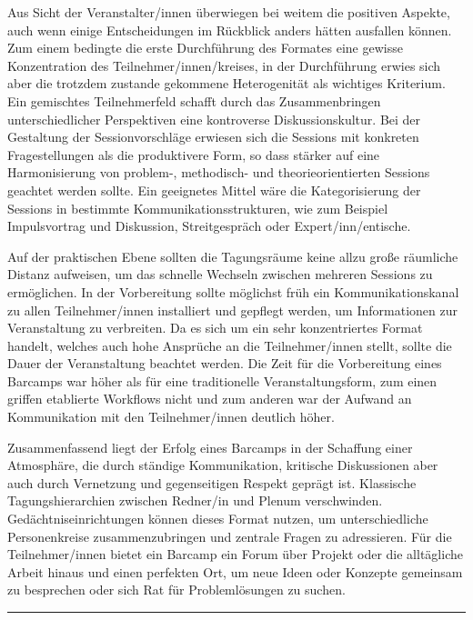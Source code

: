 \documentclass[a4paper,
fontsize=11pt,
oneside,
numbers=noperiodatend,
parskip=half-,
bibliography=totoc,
final
]{scrartcl}
\begin{document}
Aus Sicht der Veranstalter/innen überwiegen bei weitem die positiven
Aspekte, auch wenn einige Entscheidungen im Rückblick anders hätten
ausfallen können. Zum einem bedingte die erste Durchführung des Formates
eine gewisse Konzentration des Teilnehmer/innen/kreises, in der
Durchführung erwies sich aber die trotzdem zustande gekommene
Heterogenität als wichtiges Kriterium. Ein gemischtes Teilnehmerfeld
schafft durch das Zusammenbringen unterschiedlicher Perspektiven eine
kontroverse Diskussionskultur. Bei der Gestaltung der Sessionvorschläge
erwiesen sich die Sessions mit konkreten Fragestellungen als die
produktivere Form, so dass stärker auf eine Harmonisierung von problem-,
methodisch- und theorieorientierten Sessions geachtet werden sollte. Ein
geeignetes Mittel wäre die Kategorisierung der Sessions in bestimmte
Kommunikationsstrukturen, wie zum Beispiel Impulsvortrag und Diskussion,
Streitgespräch oder Expert/inn/entische.

Auf der praktischen Ebene sollten die Tagungsräume keine allzu große
räumliche Distanz aufweisen, um das schnelle Wechseln zwischen mehreren
Sessions zu ermöglichen. In der Vorbereitung sollte möglichst früh ein
Kommunikationskanal zu allen Teilnehmer/innen installiert und gepflegt
werden, um Informationen zur Veranstaltung zu verbreiten. Da es sich um
ein sehr konzentriertes Format handelt, welches auch hohe Ansprüche an
die Teilnehmer/innen stellt, sollte die Dauer der Veranstaltung beachtet
werden. Die Zeit für die Vorbereitung eines Barcamps war höher als für
eine traditionelle Veranstaltungsform, zum einen griffen etablierte
Workflows nicht und zum anderen war der Aufwand an Kommunikation mit den
Teilnehmer/innen deutlich höher.

Zusammenfassend liegt der Erfolg eines Barcamps in der Schaffung einer
Atmosphäre, die durch ständige Kommunikation, kritische Diskussionen
aber auch durch Vernetzung und gegenseitigen Respekt geprägt ist.
Klassische Tagungshierarchien zwischen Redner/in und Plenum
verschwinden. Gedächtniseinrichtungen können dieses Format nutzen, um
unterschiedliche Personenkreise zusammenzubringen und zentrale Fragen zu
adressieren. Für die Teilnehmer/innen bietet ein Barcamp ein Forum über
Projekt oder die alltägliche Arbeit hinaus und einen perfekten Ort, um
neue Ideen oder Konzepte gemeinsam zu besprechen oder sich Rat für
Problemlösungen zu suchen.

\begin{center}\rule{0.5\linewidth}{\linethickness}\end{center}
\end{document}
